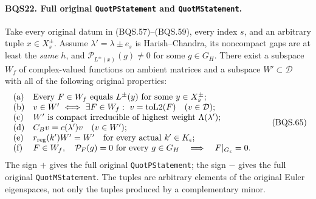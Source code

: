 \paragraph{BQS22. Full original \texttt{QuotPStatement} and \texttt{QuotMStatement}.}
\label{claim:BQS22}
Take every original datum in (BQS.57)--(BQS.59), every index $s$,
and an arbitrary tuple $x\in X_s^\pm$.
Assume $\lambda'=\lambda\pm e_s$ is Harish--Chandra, its
noncompact gaps are at least the \emph{same} $h$, and
$\mathcal P_{L^\pm(x)}(g)\ne0$ for some $g\in G_H$.
There exist a subspace $W_f$ of complex-valued functions on
ambient matrices and a subspace $W'\subset\mathcal D$ with all
of the following original properties:
\[
 \begin{array}{ll}
 {\rm (a)}&
  \text{Every }F\in W_f\text{ equals }L^\pm(y)
                        \text{ for some }y\in X_s^\pm;\\
 {\rm (b)}&
  v\in W'\ \Longleftrightarrow\
       \exists F\in W_f:\ v=\operatorname{toL2}(F)
                         \quad(v\in\mathcal D);\\
 {\rm (c)}&
  W'\text{ is compact irreducible of highest weight }
                               \Lambda(\lambda');\\
 {\rm (d)}& C_B v=c(\lambda')v\quad(v\in W');\\
 {\rm (e)}&
  r_{\rm reg}(k')W'=W'\quad\text{for every actual }k'\in K_\epsilon;\\
 {\rm (f)}&
  F\in W_f,\quad \mathcal P_F(g)=0\text{ for every }g\in G_H
               \quad\Longrightarrow\quad F|_{G_\epsilon}=0.
 \end{array}
 \tag{BQS.65}
\]
The sign $+$ gives the full original \texttt{QuotPStatement};
the sign $-$ gives the full original \texttt{QuotMStatement}.
The tuples are arbitrary elements of the original Euler eigenspaces,
not only the tuples produced by a complementary minor.

